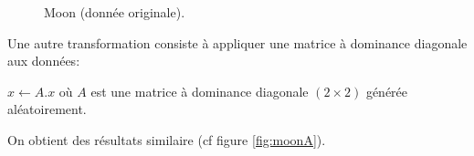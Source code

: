\begin{figure}[htbp]
\centering
{}
\hfill
{}
\caption{Moon (donnée originale).}
\end{figure}

Une autre transformation consiste à appliquer une matrice à dominance
diagonale aux données:

$ x \gets A.x $ où $A$ est une matrice à dominance diagonale $(2\times2)$
générée aléatoirement.

On obtient des résultats similaire (cf figure \ref{fig:moonA}).

